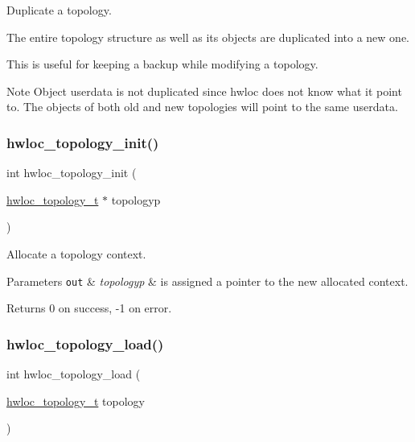 Duplicate a topology. 

The entire topology structure as well as its objects are duplicated into a new one.

This is useful for keeping a backup while modifying a topology.

\begin{DoxyNote}{Note}
Object userdata is not duplicated since hwloc does not know what it point to. The objects of both old and new topologies will point to the same userdata. 
\end{DoxyNote}
\mbox{\label{a00186_ga03fd4a16d8b9ee1ffc32b25fd2f6bdfa}} 
\subsubsection{\texorpdfstring{hwloc\+\_\+topology\+\_\+init()}{hwloc\_topology\_init()}}
{\footnotesize\ttfamily int hwloc\+\_\+topology\+\_\+init (\begin{DoxyParamCaption}\item[{\hyperlink{a00186_ga9d1e76ee15a7dee158b786c30b6a6e38}{hwloc\+\_\+topology\+\_\+t} $\ast$}]{topologyp }\end{DoxyParamCaption})}



Allocate a topology context. 


\begin{DoxyParams}[1]{Parameters}
\mbox{\tt out}  & {\em topologyp} & is assigned a pointer to the new allocated context.\\
\hline
\end{DoxyParams}
\begin{DoxyReturn}{Returns}
0 on success, -\/1 on error. 
\end{DoxyReturn}
\mbox{\label{a00186_gabdf58d87ad77f6615fccdfe0535ff826}} 
\subsubsection{\texorpdfstring{hwloc\+\_\+topology\+\_\+load()}{hwloc\_topology\_load()}}
{\footnotesize\ttfamily int hwloc\+\_\+topology\+\_\+load (\begin{DoxyParamCaption}\item[{\hyperlink{a00186_ga9d1e76ee15a7dee158b786c30b6a6e38}{hwloc\+\_\+topology\+\_\+t}}]{topology }\end{DoxyParamCaption})}



